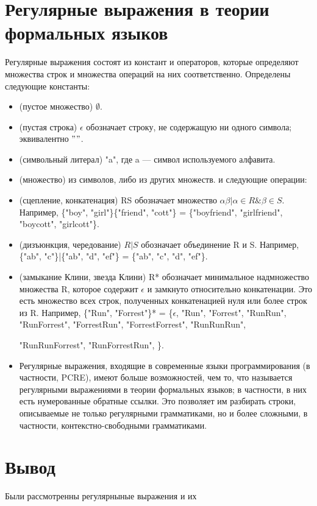\documentclass[12pt]{report}
\begin{document}
\section{Регулярные выражения в теории формальных языков}
Регулярные выражения состоят из констант и операторов, которые определяют множества строк и множества операций на них соответственно. Определены следующие константы:
\begin{itemize}
\item (пустое множество) $\emptyset$.
\item (пустая строка) $\epsilon$ обозначает строку, не содержащую ни одного символа; эквивалентно $""$.
\item (символьный литерал) "a", где a — символ используемого алфавита.
\item (множество) из символов, либо из других множеств.
и следующие операции:
\end{itemize}
\begin{itemize}
	\item (сцепление, конкатенация) RS обозначает множество ${\alpha\beta | \alpha \in R  \& \beta \in S}$. Например, \{"boy", "girl"\}\{"friend", "cott"\} = \{"boyfriend", "girlfriend", "boycott", "girlcott"\}.
	\item(дизъюнкция, чередование) $R|S$ обозначает объединение R и S. Например, \{"ab", "c"\}|\{"ab", "d", "ef"\} = \{"ab", "c", "d", "ef"\}.
	\item(замыкание Клини, звезда Клини) R* обозначает минимальное надмножество множества R, которое содержит $\epsilon$ и замкнуто относительно конкатенации. Это есть множество всех строк, полученных конкатенацией нуля или более строк из R. Например, \{"Run", "Forrest"\}* = \{$\epsilon$, "Run", "Forrest", "RunRun", "RunForrest", "ForrestRun", "ForrestForrest", "RunRunRun",
	
	 "RunRunForrest", "RunForrestRun", \}.
	\item Регулярные выражения, входящие в современные языки программирования (в частности, PCRE), имеют больше возможностей, чем то, что называется регулярными выражениями в теории формальных языков; в частности, в них есть нумерованные обратные ссылки. Это позволяет им разбирать строки, описываемые не только регулярными грамматиками, но и более сложными, в частности, контекстно-свободными грамматиками.
\end{itemize}
\section{Вывод}
Были рассмотренны регулярныные выражения и их 
\end{document}
